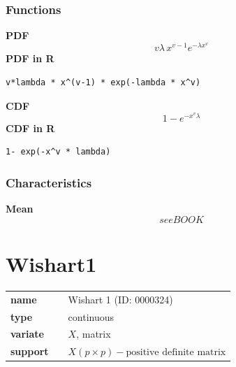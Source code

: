 \subsubsection*{Functions}

\smallskip \noindent \hspace{.2cm} \textbf{PDF} 
\begin{equation*}v\lambda \,x^{v-1} e^{-\lambda x^{v}}\end{equation*}
\smallskip \noindent \hspace{.2cm} \textbf{PDF in R}  
\begin{verbatim}v*lambda * x^(v-1) * exp(-lambda * x^v)\end{verbatim}
\smallskip \noindent \hspace{.2cm} \textbf{CDF} 
\begin{equation*}1- e^{-x^v \lambda}\end{equation*}
\smallskip \noindent \hspace{.2cm} \textbf{CDF in R} 
\begin{verbatim}1- exp(-x^v * lambda)\end{verbatim}
\smallskip
\subsubsection*{Characteristics}
\smallskip \noindent \hspace{.2cm} \textbf{Mean} 
\begin{equation*}see BOOK\end{equation*}
\smallskip
\section*{Wishart1} 

  \bigskip 

\begin{tabular}{p{2cm}cl}
\textbf{name} & & Wishart 1 (ID: 0000324)\\ 
 
\textbf{type} & & continuous \\ 

\textbf{variate} & & $X$, matrix \\ 

\textbf{support} & & $X(p \times p) - \text{positive definite matrix}$
\end{tabular}


